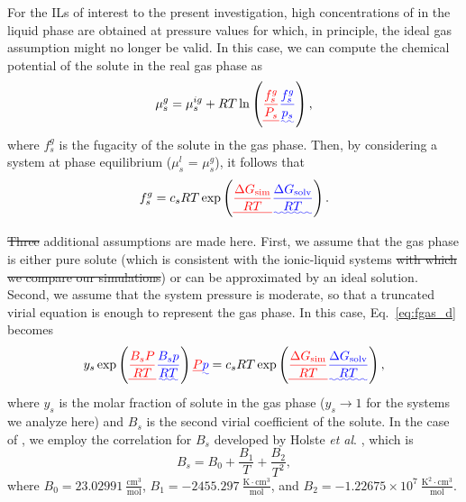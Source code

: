 \documentclass[3p,twocolumn]{elsarticle}
\providecommand{\DIFadd}[1]{{\protect\color{blue}\uwave{#1}}} %
\providecommand{\DIFdel}[1]{{\protect\color{red}\sout{#1}}}                      %
\providecommand{\DIFaddbegin}{} %
\providecommand{\DIFaddend}{} %
\providecommand{\DIFdelbegin}{} %
\providecommand{\DIFdelend}{} %
\newcommand{\DIFscaledelfig}{0.5}
\newlength{\DIFdelgraphicswidth} %
\newlength{\DIFdelgraphicsheight} %
\newcommand{\DIFaddincludegraphics}[2][]{{\color{blue}\fbox{\DIFOincludegraphics[#1]{#2}}}} %
\newcommand{\DIFdelincludegraphics}[2][]{%
\sbox{\DIFdelgraphicsbox}{\DIFOincludegraphics[#1]{#2}}%
\settoboxwidth{\DIFdelgraphicswidth}{\DIFdelgraphicsbox} %
\settoboxtotalheight{\DIFdelgraphicsheight}{\DIFdelgraphicsbox} %
\scalebox{\DIFscaledelfig}{%
\parbox[b]{\DIFdelgraphicswidth}{\usebox{\DIFdelgraphicsbox}\\[-\baselineskip] \rule{\DIFdelgraphicswidth}{0em}}\llap{\resizebox{\DIFdelgraphicswidth}{\DIFdelgraphicsheight}{%
\setlength{\unitlength}{\DIFdelgraphicswidth}%
\begin{picture}(1,1)%
\thicklines\linethickness{2pt} %
{\color[rgb]{1,0,0}\put(0,0){\framebox(1,1){}}}%
{\color[rgb]{1,0,0}\put(0,0){\line( 1,1){1}}}%
{\color[rgb]{1,0,0}\put(0,1){\line(1,-1){1}}}%
\end{picture}%
}\hspace*{3pt}}} %
} %
\DeclareRobustCommand{\DIFaddbegin}{\DIFOaddbegin \let\includegraphics\DIFaddincludegraphics} %
\DeclareRobustCommand{\DIFaddend}{\DIFOaddend \let\includegraphics\DIFOincludegraphics} %
\DeclareRobustCommand{\DIFdelbegin}{\DIFOdelbegin \let\includegraphics\DIFdelincludegraphics} %
\DeclareRobustCommand{\DIFdelend}{\DIFOaddend \let\includegraphics\DIFOincludegraphics} %
\begin{document}
For the ILs of interest to the present investigation, high concentrations of  in the liquid phase are obtained at pressure values for which, in principle, the ideal gas assumption might no longer be valid.
In this case, we can compute the chemical potential of the solute in the real gas phase as
\begin{equation}
\label{eq:mu_gas_real}
\mu^{g}_s = \mu^{ig}_s + R T \ln \left(\DIFdelbegin \DIFdel{\frac{f^{g}_s}{P_s}}\DIFdelend \DIFaddbegin \DIFadd{\frac{f^{g}_s}{p_s}}\DIFaddend \right),
\end{equation}
where $f^{g}_s$ is the fugacity of the solute in the gas phase.
Then, by considering a system at phase equilibrium ($\mu^{l}_s$ = $\mu^{g}_s$), it follows that
\begin{equation}
\label{eq:fgas_d}
f^{g}_s = c_s R T \exp \left( \DIFdelbegin \DIFdel{\frac{\Delta G_\text{sim}}{R T} }\DIFdelend \DIFaddbegin \DIFadd{\frac{\Delta G_\text{solv}}{R T} }\DIFaddend \right). 
\end{equation}

\DIFdelbegin \DIFdel{Three }\DIFdelend \DIFaddbegin \DIFadd{Two }\DIFaddend additional assumptions are made here. First, we assume that the gas phase is either pure solute (which is consistent with the ionic-liquid systems \DIFdelbegin \DIFdel{with which we compare our simulations}\DIFdelend \DIFaddbegin \DIFadd{we investigate here}\DIFaddend ) or can be approximated by an ideal solution. Second, we assume that the system pressure is moderate, so that a truncated virial equation is enough to represent the gas phase. In this case, Eq.~\eqref{eq:fgas_d} becomes
\begin{equation}
\label{eq:equilibrium pressure}
y_s \exp\left( \DIFdelbegin \DIFdel{\frac{B_s P}{R T} }\DIFdelend \DIFaddbegin \DIFadd{\frac{B_s p}{R T} }\DIFaddend \right) \DIFdelbegin \DIFdel{P }\DIFdelend \DIFaddbegin \DIFadd{p }\DIFaddend = c_s R T \exp \left( \DIFdelbegin \DIFdel{\frac{\Delta G_\text{sim}}{R T} }\DIFdelend \DIFaddbegin \DIFadd{\frac{\Delta G_\text{solv}}{R T} }\DIFaddend \right),
\end{equation}
where $y_s$ is the molar fraction of solute in the gas phase ($y_s \rightarrow 1$ for the systems we analyze here) and $B_s$ is the second virial coefficient of the solute.
In the case of , we employ the correlation for $B_s$ developed by Holste \textit{et al}. \cite{Holste_1987}, which is
\begin{equation}
B_s = B_0 + \frac{B_1}{T} + \frac{B_2}{T^2},
\end{equation}
where $B_0 = 23.02991~\mathrm{\frac{cm^3}{mol}}$, $B_1 = -2455.297~\mathrm{\frac{K \cdot cm^3}{mol}}$, and $B_2 = -1.22675 \times 10^7~\mathrm{\frac{K^2 \cdot cm^3}{mol}}$.
\end{document}
